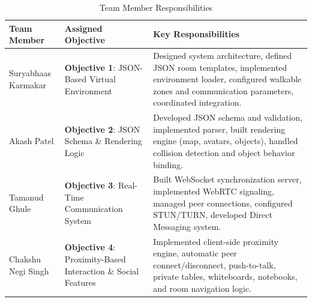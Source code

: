 \documentclass[12pt]{article}
\begin{document}
\begin{table}[h!]
\centering
\renewcommand{\arraystretch}{1.5}
\begin{tabular}{|p{4cm}|p{4cm}|p{7cm}|}
\hline
\textbf{Team Member} & \textbf{Assigned Objective} & \textbf{Key Responsibilities} \\ 
\hline

Suryabhaas Karmakar & \textbf{Objective 1}: JSON-Based Virtual Environment & Designed system architecture, defined JSON room templates, implemented environment loader, configured walkable zones and communication parameters, coordinated integration. \\ 
\hline

Akash Patel & \textbf{Objective 2}: JSON Schema \& Rendering Logic & Developed JSON schema and validation, implemented parser, built rendering engine (map, avatars, objects), handled collision detection and object behavior binding. \\ 
\hline

Tamanud Ghule & \textbf{Objective 3}: Real-Time Communication System & Built WebSocket synchronization server, implemented WebRTC signaling, managed peer connections, configured STUN/TURN, developed Direct Messaging system. \\ 
\hline

Chakshu Negi Singh & \textbf{Objective 4}: Proximity-Based Interaction \& Social Features & Implemented client-side proximity engine, automatic peer connect/disconnect, push-to-talk, private tables, whiteboards, notebooks, and room navigation logic. \\ 
\hline

\end{tabular}
\caption{Team Member Responsibilities}

\end{table}
\end{document}
